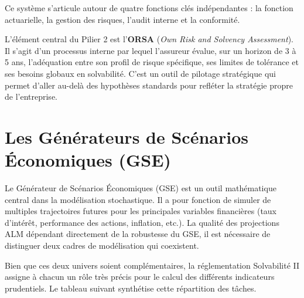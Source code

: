 Ce système s'articule autour de quatre fonctions clés indépendantes : la fonction actuarielle, la gestion des risques, l'audit interne et la conformité.

L'élément central du Pilier 2 est l'\textbf{ORSA} (\textit{Own Risk and Solvency Assessment}). Il s'agit d'un processus interne par lequel l'assureur évalue, sur un horizon de 3 à 5 ans, l'adéquation entre son profil de risque spécifique, ses limites de tolérance et ses besoins globaux en solvabilité. C'est un outil de pilotage stratégique qui permet d'aller au-delà des hypothèses standards pour refléter la stratégie propre de l'entreprise.

\section{Les Générateurs de Scénarios Économiques (GSE)}
\label{sec:gse}

Le Générateur de Scénarios Économiques (GSE) est un outil mathématique central dans la modélisation stochastique. Il a pour fonction de simuler de multiples trajectoires futures pour les principales variables financières (taux d'intérêt, performance des actions, inflation, etc.). La qualité des projections ALM dépendant directement de la robustesse du GSE, il est nécessaire de distinguer deux cadres de modélisation qui coexistent.

Bien que ces deux univers soient complémentaires, la réglementation Solvabilité II assigne à chacun un rôle très précis pour le calcul des différents indicateurs prudentiels. Le tableau suivant synthétise cette répartition des tâches.

